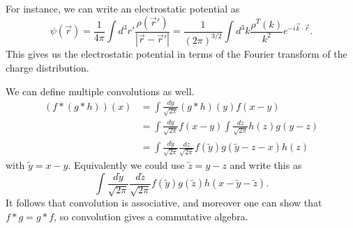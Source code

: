 For instance, we can write an electrostatic potential as
\begin{equation}
    \psi(\vec r) = \frac{1}{4\pi} \int d^3 r' \frac{\rho(\vec r')}{|\vec r- \vec r'|} = \frac{1}{(2\pi)^{3/2}}\int d^3 k \frac{\rho^T(k)}{k^2} e^{-i\vec k \cdot \vec r}.
\end{equation}
This gives us the electrostatic potential in terms of the Fourier transform of the charge distribution.

We can define multiple convolutions as well.
\begin{align*}
    (f*(g*h))(x) &= \int \frac{dy}{\sqrt{2\pi}}(g*h)(y) f(x-y)\\
        &= \int \frac{dy}{\sqrt{2\pi}} f(x-y) \int \frac{dz}{\sqrt{2\pi}} h(z) g(y-z)\\
        &= \int \frac{d\tilde y}{\sqrt{2\pi}} \frac{dz}{\sqrt{2\pi}} f(\tilde y) g(\tilde y-z-x) h(z)
\end{align*}
with $\tilde y = x-y$. Equivalently we could use $\tilde z = y-z$ and write this as
\begin{equation}
    \int \frac{d\tilde y}{\sqrt{2\pi}} \frac{d\tilde z}{\sqrt{2\pi}} f(\tilde y) g(\tilde z) h(x-\tilde y - \tilde z).
\end{equation}
It follows that convolution is associative, and moreover one can show that $f*g=g*f$, so convolution gives a commutative algebra.

